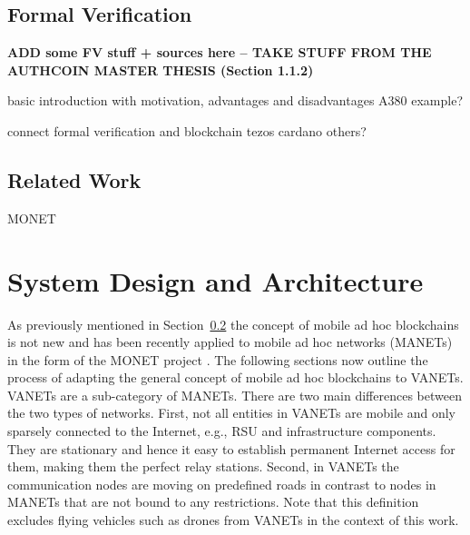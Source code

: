 \documentclass{llncs}
\begin{document}
{		%
		
		\subsection{Formal Verification}
			\label{ss:formal-verification}

			\textbf{ADD some FV stuff + sources here -- TAKE STUFF FROM THE AUTHCOIN MASTER THESIS \cite{leiding2017securing} (Section 1.1.2)}			
			
			basic introduction with motivation, advantages and disadvantages
			A380 example?
			
			
			connect formal verification and blockchain
			tezos \cite{tezosWhitepaper}
			cardano \cite{bibid}
			others?
		
		\subsection{Related Work}
			\label{ss:related-work}

			MONET \cite{monetWhitepaper}
			
		


	\section{System Design and Architecture}
		\label{s:section-3}
		
		
		As previously mentioned in Section~\ref{ss:related-work} the concept of mobile ad hoc blockchains is not new and has been recently applied to mobile ad hoc networks (MANETs) in the form of the MONET project \cite{monetWhitepaper}. The following sections now outline the process of adapting the general concept of mobile ad hoc blockchains to VANETs. VANETs are a sub-category of MANETs. There are two main differences between the two types of networks. First, not all entities in VANETs are mobile and only sparsely connected to the Internet, e.g., RSU and infrastructure components. They are stationary and hence it easy to establish permanent Internet access for them, making them the perfect relay stations. Second, in VANETs the communication nodes are moving on predefined roads in contrast to nodes in MANETs that are not bound to any restrictions. Note that this definition excludes flying vehicles such as drones from VANETs in the context of this work.  
		
}
\end{document}
